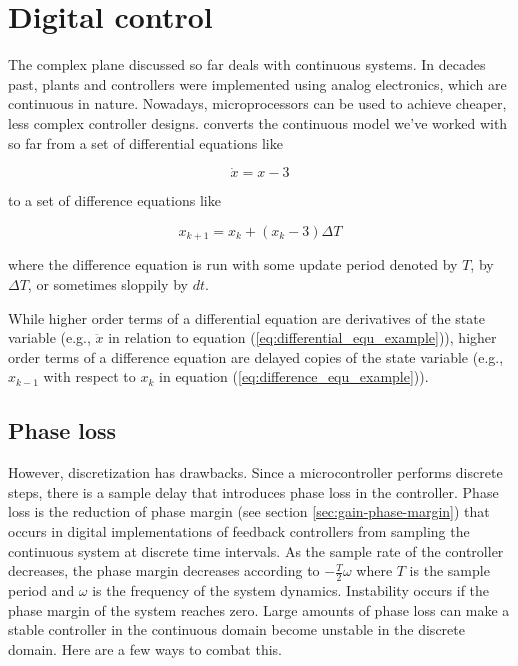 
\chapter{Digital control} \label{ch:digital_control}

The complex plane discussed so far deals with continuous \glspl{system}. In
decades past, \glspl{plant} and controllers were implemented using analog
electronics, which are continuous in nature. Nowadays, microprocessors can be
used to achieve cheaper, less complex controller designs.
 converts the continuous model we've
worked with so far from a set of differential equations like

\begin{equation}
  \dot{x} = x - 3 \label{eq:differential_equ_example}
\end{equation}

to a set of difference equations like

\begin{equation}
  x_{k+1} = x_k + (x_k - 3) \Delta T \label{eq:difference_equ_example}
\end{equation}

where the difference equation is run with some update period denoted by $T$, by
$\Delta T$, or sometimes sloppily by $dt$.

While higher order terms of a differential equation are derivatives of the state
variable (e.g., $\ddot{x}$ in relation to equation
(\ref{eq:differential_equ_example})), higher order terms of a difference
equation are delayed copies of the state variable (e.g., $x_{k-1}$ with respect
to $x_k$ in equation (\ref{eq:difference_equ_example})).

\section{Phase loss} \label{sec:phase_loss}

However, \gls{discretization} has drawbacks. Since a microcontroller performs
discrete steps, there is a sample delay that introduces phase loss in the
controller. Phase loss is the reduction of phase margin (see section
\ref{sec:gain-phase-margin}) that occurs in digital implementations of feedback
controllers from sampling the continuous system at discrete time intervals. As
the sample rate of the controller decreases, the phase margin decreases
according to $-\frac{T}{2}\omega$ where $T$ is the sample period and $\omega$ is
the frequency of the system dynamics. Instability occurs if the phase margin of
the system reaches zero. Large amounts of phase loss can make a stable
controller in the continuous domain become unstable in the discrete domain. Here
are a few ways to combat this.

